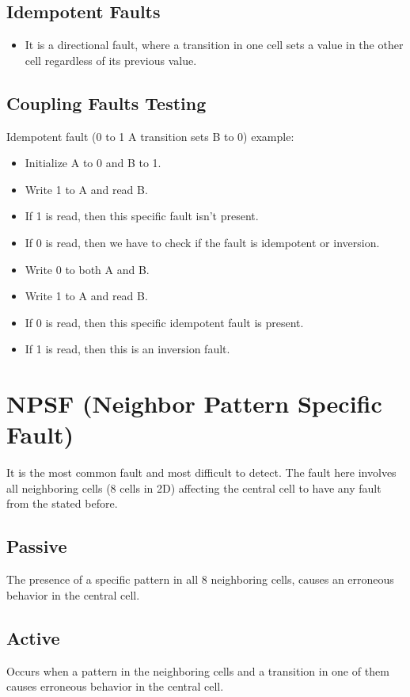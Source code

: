 \documentclass[11pt]{article}
\begin{document}
\subsection*{Idempotent Faults}
\begin{itemize}
    \item It is a directional fault, where a transition in one cell sets a value in the other cell regardless of its previous value.
\end{itemize}

\subsection*{Coupling Faults Testing}
Idempotent fault (0 to 1 A transition sets B to 0) example:
\begin{itemize}
    \item Initialize A to 0 and B to 1.
    \item Write 1 to A and read B.
    \item If 1 is read, then this specific fault isn't present.
    \item If 0 is read, then we have to check if the fault is idempotent or inversion.
    \item Write 0 to both A and B.
    \item Write 1 to A and read B.
    \item If 0 is read, then this specific idempotent fault is present.
    \item If 1 is read, then this is an inversion fault.
\end{itemize}

\section*{NPSF (Neighbor Pattern Specific Fault)}
It is the most common fault and most difficult to detect. The fault here involves all neighboring cells (8 cells in 2D) affecting the central cell to have any fault from the stated before. 

\subsection*{Passive}
The presence of a specific pattern in all 8 neighboring cells, causes an erroneous behavior in the central cell.

\subsection*{Active}
Occurs when a pattern in the neighboring cells and a transition in one of them causes erroneous behavior in the central cell.
\end{document}
